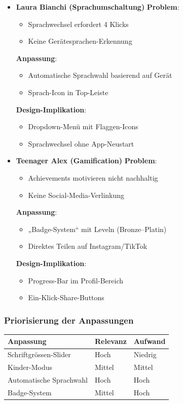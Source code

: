 \documentclass[10pt]{article}
\begin{document}
\begin{itemize}
		\item \textbf{Laura Bianchi (Sprachumschaltung)}
		\subitem \textbf{Problem}: 
		\begin{itemize}
			\item Sprachwechsel erfordert 4 Klicks
			\item Keine Gerätesprachen-Erkennung
		\end{itemize}
		\subitem \textbf{Anpassung}: 
		\begin{itemize}
			\item Automatische Sprachwahl basierend auf Gerät
			\item Sprach-Icon in Top-Leiste
		\end{itemize}
		\subitem \textbf{Design-Implikation}: 
		\begin{itemize}
			\item Dropdown-Menü mit Flaggen-Icons
			\item Sprachwechsel ohne App-Neustart
		\end{itemize}
		
		\item \textbf{Teenager Alex (Gamification)}
		\subitem \textbf{Problem}: 
		\begin{itemize}
			\item Achievements motivieren nicht nachhaltig
			\item Keine Social-Media-Verlinkung
		\end{itemize}
		\subitem \textbf{Anpassung}: 
		\begin{itemize}
			\item „Badge-System“ mit Leveln (Bronze–Platin)
			\item Direktes Teilen auf Instagram/TikTok
		\end{itemize}
		\subitem \textbf{Design-Implikation}: 
		\begin{itemize}
			\item Progress-Bar im Profil-Bereich
			\item Ein-Klick-Share-Buttons
		\end{itemize}
	\end{itemize}
	
	\subsubsection{Priorisierung der Anpassungen}
	\begin{center}
		\begin{tabular}{|l|l|l|}
			\hline
			\textbf{Anpassung} & \textbf{Relevanz} & \textbf{Aufwand} \\ 
			\hline
			Schriftgrössen-Slider & Hoch & Niedrig \\
			Kinder-Modus & Mittel & Mittel \\
			Automatische Sprachwahl & Hoch & Hoch \\
			Badge-System & Mittel & Hoch \\
			\hline
		\end{tabular}
	\end{center}
	
\end{document}
